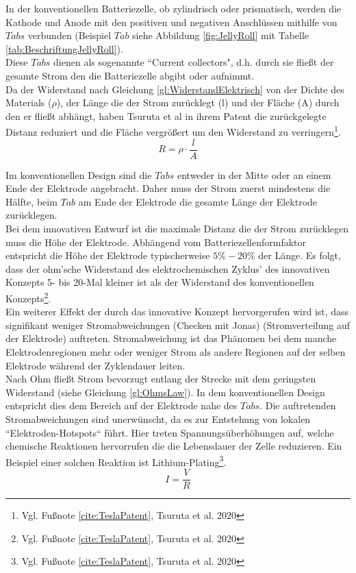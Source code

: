 In der konventionellen Batteriezelle, ob zylindrisch oder prismatisch, werden die Kathode und Anode mit den positiven und negativen Anschlüssen mithilfe von $Tabs$ verbunden (Beispiel $Tab$ siehe Abbildung \ref{fig:JellyRoll} mit Tabelle \ref{tab:BeschriftungJellyRoll}). \\
Diese $Tabs$ dienen als sogenannte ``Current collectors", d.h. durch sie fließt der gesamte Strom den die Batteriezelle abgibt oder aufnimmt. \\
Da der Widerstand nach Gleichung \ref{gl:WiderstandElektrisch} von der Dichte des Materials ($\rho$), der Länge die der Strom zurücklegt (l) und der Fläche (A) durch den er fließt abhängt, haben Tsuruta et al in ihrem Patent die zurückgelegte Distanz reduziert und die Fläche vergrößert um den Widerstand zu verringern\footnote{Vgl. Fußnote \ref{cite:TeslaPatent}, Tsuruta et al. 2020}.
\begin{equation}
	R = \rho \cdot \frac{l}{A}
	\label{gl:WiderstandElektrisch}
\end{equation}

Im konventionellen Design sind die $Tabs$ entweder in der Mitte oder an einem Ende der Elektrode angebracht. Daher muss der Strom zuerst mindestens die Hälfte, beim $Tab$ am Ende der Elektrode die gesamte Länge der Elektrode zurücklegen. \\
Bei dem innovativen Entwurf ist die maximale Distanz die der Strom zurücklegen muss die Höhe der Elektrode. Abhängend vom Batteriezellenformfaktor entspricht die Höhe der Elektrode typischerweise $5\percent-20\percent$ der Länge. Es folgt, dass der ohm'sche Widerstand des elektrochemischen Zyklus' des innovativen Konzepts 5- bis 20-Mal kleiner ist als der Widerstand des konventionellen Konzepts\footnote{Vgl. Fußnote \ref{cite:TeslaPatent}, Tsuruta et al. 2020}.\\
Ein weiterer Effekt der durch das innovative Konzept hervorgerufen wird ist, dass signifikant weniger Stromabweichungen (Checken mit Jonas) (Stromverteilung auf der Elektrode) auftreten. Stromabweichung ist das Phänomen bei dem manche Elektrodenregionen mehr oder weniger Strom als andere Regionen auf der selben Elektrode während der Zyklendauer leiten.\\
Nach Ohm fließt Strom bevorzugt entlang der Strecke mit dem geringsten Widerstand (siehe Gleichung \ref{gl:OhmsLaw}). In dem konventionellen Design entspricht dies dem Bereich auf der Elektrode nahe des $Tabs$. Die auftretenden Stromabweichungen sind unerwünscht, da es zur Entstehung von lokalen ``Elektroden-Hotspots`` führt. Hier treten Spannungsüberhöhungen auf, welche chemische Reaktionen hervorrufen die die Lebensdauer der Zelle reduzieren. Ein Beispiel einer solchen Reaktion ist Lithium-Plating\footnote{Vgl. Fußnote \ref{cite:TeslaPatent}, Tsuruta et al. 2020}.
\begin{equation}
	I = \frac{V}{R}
	\label{gl:OhmsLaw}
\end{equation}

